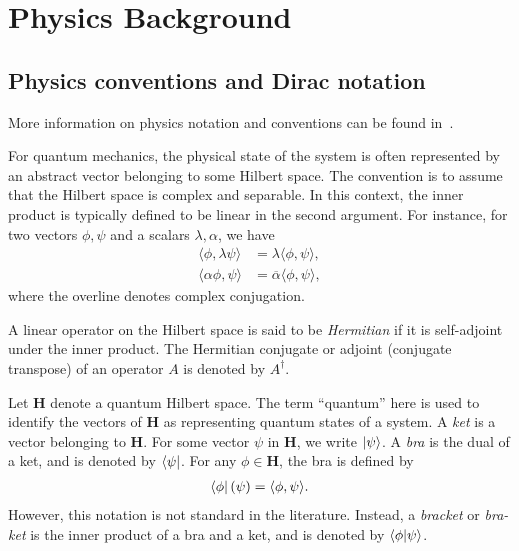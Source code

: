 \chapter{Physics Background}\label{ch:physics_background}

\section{Physics conventions and Dirac notation}\label{sec:basics}

More information on physics notation and conventions can be found in~\cite{Hall2013,Griffiths2018,Tung1985,Zwiebach2022}.

For quantum mechanics, the physical state of the system is often represented by an abstract vector belonging to some Hilbert space. The convention is to assume that the Hilbert space is complex and separable. In this context, the inner product is typically defined to be linear in the second argument. For instance, for two vectors $\phi,\psi$ and a scalars $\lambda,\alpha$, we have
\begin{align*}
    \langle \phi,\lambda\psi\rangle&=\lambda\langle \phi,\psi\rangle, \\
    \langle \alpha\phi,\psi\rangle&=\overline{\alpha}\langle \phi,\psi\rangle,
\end{align*}
where the overline denotes complex conjugation.

A linear operator on the Hilbert space is said to be \textit{Hermitian} if it is self-adjoint under the inner product. The Hermitian conjugate or adjoint (conjugate transpose) of an operator $A$ is denoted by $A^\dagger$.

Let $\mathbf{H}$ denote a quantum Hilbert space. The term ``quantum'' here is used to identify the vectors of $\mathbf{H}$ as representing quantum states of a system. A \textit{ket} is a vector belonging to $\mathbf{H}$. For some vector $\psi$ in $\mathbf{H}$, we write $\ket{\psi}$. A \textit{bra} is the dual of a ket, and is denoted by $\bra{\psi}$. For any $\phi\in \mathbf{H}$, the bra is defined by
\begin{align*}
    \bra{\phi}(\psi) = \langle \phi,\psi\rangle.
\end{align*}
However, this notation is not standard in the literature. Instead, a \textit{bracket} or \textit{bra-ket} is the inner product of a bra and a ket, and is denoted by $\braket{\phi|\psi}$.

